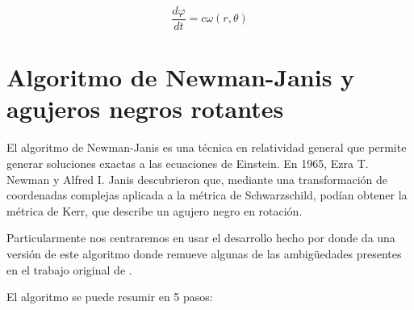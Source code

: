 $$
    \frac{d \varphi}{d t}=c \omega(r, \theta)
$$


\section{Algoritmo de Newman-Janis y agujeros negros rotantes}

El algoritmo de Newman-Janis es una técnica en relatividad general que permite generar soluciones exactas a las ecuaciones de Einstein. En 1965, Ezra T. Newman y Alfred I. Janis \cite{newman-1965} descubrieron que, mediante una transformación de coordenadas complejas aplicada a la métrica de Schwarzschild, podían obtener la métrica de Kerr, que describe un agujero negro en rotación.

Particularmente nos centraremos en usar el desarrollo hecho por \cite{drake-2000} donde da una versión de este algoritmo donde remueve algunas de las ambigüedades presentes en el trabajo original de \cite{newman-1965}.

El algoritmo se puede resumir en 5 pasos:

